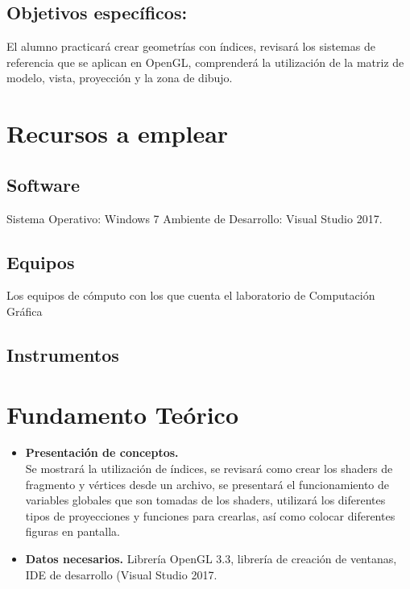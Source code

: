 \documentclass[11pt, english]{article}
\begin{document}
\subsection{Objetivos específicos:}
El alumno practicará crear geometrías con índices, revisará los sistemas de referencia que
se aplican en OpenGL, comprenderá la utilización de la matriz de modelo, vista, proyección
y la zona de dibujo.
\section{Recursos a emplear}
\subsection{Software}
Sistema Operativo: Windows 7
Ambiente de Desarrollo: Visual Studio 2017.
\subsection{Equipos}
Los equipos de cómputo con los que cuenta el laboratorio de Computación Gráfica
\subsection{Instrumentos}
\section{Fundamento Teórico}
\begin{itemize}
\item \textbf{Presentación de conceptos.} \\
Se mostrará la utilización de índices, se revisará como crear los shaders de fragmento y
vértices desde un archivo, se presentará el funcionamiento de variables globales que son
tomadas de los shaders, utilizará los diferentes tipos de proyecciones y funciones para
crearlas, así como colocar diferentes figuras en pantalla.
\item \textbf{Datos necesarios.}
Librería OpenGL 3.3, librería de creación de ventanas, IDE de desarrollo (Visual Studio 2017.
\end{itemize}
\end{document}
